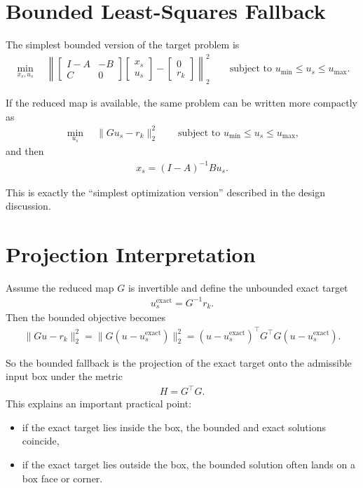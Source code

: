 \documentclass[11pt]{article}
\begin{document}
\section{Bounded Least-Squares Fallback}

The simplest bounded version of the target problem is
\begin{align}
\min_{x_s,u_s} \quad
\left\|
\begin{bmatrix}
I-A & -B \\
C   & 0
\end{bmatrix}
\begin{bmatrix}
x_s \\
u_s
\end{bmatrix}
-
\begin{bmatrix}
0 \\
r_k
\end{bmatrix}
\right\|_2^2
\qquad
\text{subject to }
u_{\min} \le u_s \le u_{\max}.
\end{align}

If the reduced map is available, the same problem can be written more compactly as
\begin{align}
\min_{u_s} \quad \|G u_s - r_k\|_2^2
\qquad
\text{subject to }
u_{\min} \le u_s \le u_{\max},
\end{align}
and then
\begin{align}
x_s = (I-A)^{-1}B u_s.
\end{align}

This is exactly the ``simplest optimization version'' described in the design discussion.

\section{Projection Interpretation}

Assume the reduced map $G$ is invertible and define the unbounded exact target
\begin{align}
u_s^{\mathrm{exact}} = G^{-1} r_k.
\end{align}
Then the bounded objective becomes
\begin{align}
\|G u - r_k\|_2^2
=
\|G(u-u_s^{\mathrm{exact}})\|_2^2
=
(u-u_s^{\mathrm{exact}})^\top G^\top G (u-u_s^{\mathrm{exact}}).
\end{align}

So the bounded fallback is the projection of the exact target onto the admissible input box under the metric
\begin{align}
H = G^\top G.
\end{align}
This explains an important practical point:
\begin{itemize}
\item if the exact target lies inside the box, the bounded and exact solutions coincide,
\item if the exact target lies outside the box, the bounded solution often lands on a box face or corner.
\end{itemize}
\end{document}
